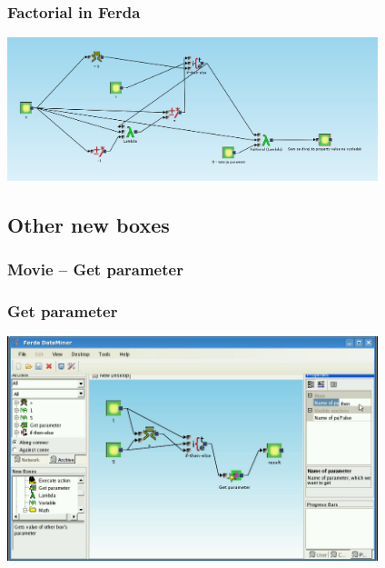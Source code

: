 \documentclass{beamer}
\begin{document}
\begin{frame}
	\frametitle{Factorial in Ferda}
	\includegraphics[width=10.8cm]{faktorial}
\end{frame}

\subsection{Other new boxes}
\begin{frame}
	\frametitle{Movie -- Get parameter}
\end{frame}

\begin{frame}
	\frametitle{Get parameter}
	\includegraphics[width=10.8cm]{getParameter2.png}
\end{frame}
\end{document}
